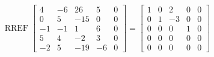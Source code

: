 \begin{exerciseAnswer} 


\[\operatorname{RREF} \left[\begin{array}{cccc|c}
4 & -6 & 26 & 5 & 0 \\
0 & 5 & -15 & 0 & 0 \\
-1 & -1 & 1 & 6 & 0 \\
5 & 4 & -2 & 3 & 0 \\
-2 & 5 & -19 & -6 & 0
\end{array}\right] = \left[\begin{array}{cccc|c}
1 & 0 & 2 & 0 & 0 \\
0 & 1 & -3 & 0 & 0 \\
0 & 0 & 0 & 1 & 0 \\
0 & 0 & 0 & 0 & 0 \\
0 & 0 & 0 & 0 & 0
\end{array}\right] \]



\end{exerciseAnswer}
